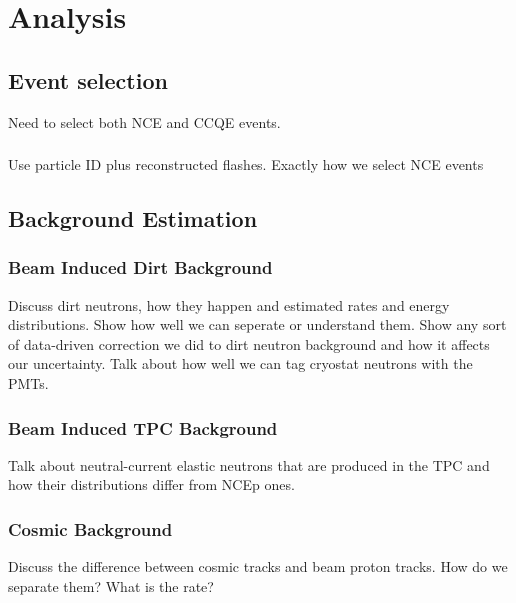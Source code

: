 \section{Analysis}\label{analysis}
\hspace{\parindent}

\subsection{Event selection}
  Need to select both NCE and CCQE events.
  \subsubsection{}
  Use particle ID plus reconstructed flashes.
  Exactly how we select NCE events 

\subsection{Background Estimation}\label{background}
  \subsubsection{Beam Induced Dirt Background}
    Discuss dirt neutrons, how they happen and estimated rates and energy
    distributions.  Show how well we can seperate or understand them. Show any
    sort of data-driven correction we did to dirt neutron background and how it
    affects our uncertainty. Talk about how well we can tag cryostat neutrons
    with the PMTs.
  \subsubsection{Beam Induced TPC Background}
    Talk about neutral-current elastic neutrons that are produced in the TPC
    and how their distributions differ from NCEp ones.
  \subsubsection{Cosmic Background}
    Discuss the difference between cosmic tracks and beam proton tracks. How do
    we separate them? What is the rate?

